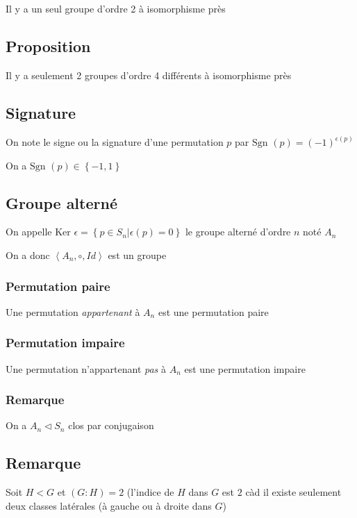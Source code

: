 \documentclass[a4paper,10pt]{article}
\newcommand{\Sgn}{\mbox{Sgn }}
\newcommand{\Ker}{\mbox{Ker }}
\newcommand{\grp}[1]{\left\langle #1 \right\rangle}
\newcommand{\tset}[1]{\left\lbrace #1 \right\rbrace}
\newcommand{\normal}{\triangleleft}
\begin{document}
Il y a un seul groupe d'ordre 2 à isomorphisme près

\subsection{Proposition}

Il y a seulement 2 groupes d'ordre 4 différents à isomorphisme près

\subsection{Signature}

On note le signe ou la signature d'une permutation $p$ par $\Sgn(p) = (-1)^{\epsilon(p)}$

On a $\Sgn(p) \in \tset{-1,1}$

\subsection{Groupe alterné}

On appelle $\Ker \epsilon = \tset{ p \in S_n \vert \epsilon(p)=0}$ le groupe alterné d'ordre $n$ noté $A_n$

On a donc $\grp{A_n,\circ,Id}$ est un groupe

\subsubsection{Permutation paire}

Une permutation \textit{appartenant} à $A_n$ est une permutation paire

\subsubsection{Permutation impaire}

Une permutation n'appartenant \textit{pas} à $A_n$ est une permutation impaire

\subsubsection{Remarque}

On a $A_n \normal S_n$ clos par conjugaison

\subsection{Remarque}

Soit $H < G$ et $(G:H)=2$ (l'indice de $H$ dans $G$ est $2$ càd il existe seulement deux classes latérales (à gauche ou à droite dans $G$)
\end{document}
